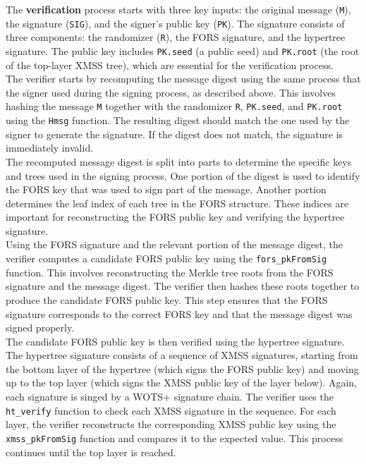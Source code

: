 \documentclass[journal=tosc,notanonymous]{iacrtrans}
\begin{document}
\newline
The \textbf{verification} process starts with three key inputs: the original message (\texttt{M}), the signature (\texttt{SIG}), and the signer's public key (\texttt{PK}). The signature consists of three components: the randomizer (\texttt{R}), the FORS signature, and the hypertree signature. The public key includes \texttt{PK.seed} (a public seed) and \texttt{PK.root} (the root of the top-layer XMSS tree), which are essential for the verification process.\\
The verifier starts by recomputing the message digest using the same process that the signer used during the signing process, as described above. This involves hashing the message \texttt{M} together with the randomizer \texttt{R}, \texttt{PK.seed}, and \texttt{PK.root} using the \texttt{Hmsg} function. The resulting digest should match the one used by the signer to generate the signature. If the digest does not match, the signature is immediately invalid.\\
The recomputed message digest is split into parts to determine the specific keys and trees used in the signing process. One portion of the digest is used to identify the FORS key that was used to sign part of the message. Another portion determines the leaf index of each tree in the FORS structure. These indices are important for reconstructing the FORS public key and verifying the hypertree signature.\\
Using the FORS signature and the relevant portion of the message digest, the verifier computes a candidate FORS public key using the \verb|fors_pkFromSig| function. This involves reconstructing the Merkle tree roots from the FORS signature and the message digest. The verifier then hashes these roots together to produce the candidate FORS public key. This step ensures that the FORS signature corresponds to the correct FORS key and that the message digest was signed properly.\\
The candidate FORS public key is then verified using the hypertree signature. The hypertree signature consists of a sequence of XMSS signatures, starting from the bottom layer of the hypertree (which signs the FORS public key) and moving up to the top layer (which signs the XMSS public key of the layer below). Again, each signature is singed by a WOTS+ signature chain. The verifier uses the \verb|ht_verify| function to check each XMSS signature in the sequence. For each layer, the verifier reconstructs the corresponding XMSS public key using the \verb|xmss_pkFromSig| function and compares it to the expected value. This process continues until the top layer is reached.\\
\end{document}
